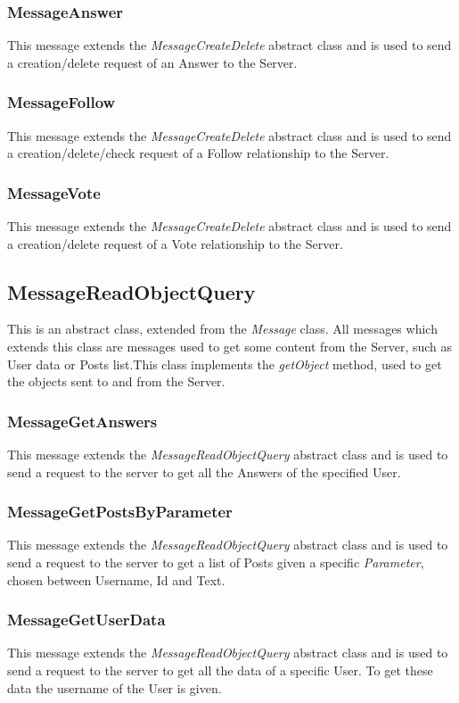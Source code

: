 \documentclass[11pt]{report}
\begin{document}
\subsubsection{MessageAnswer}
This message extends the \textit{MessageCreateDelete} abstract class and is used to send a creation/delete request of an Answer to the Server.
\subsubsection{MessageFollow}
This message extends the \textit{MessageCreateDelete} abstract class and is used to send a creation/delete/check request of a Follow relationship to the Server.
\subsubsection{MessageVote}
This message extends the \textit{MessageCreateDelete} abstract class and is used to send a creation/delete request of a Vote relationship to the Server. 
\newpage
\subsection{MessageReadObjectQuery}
This is an abstract class, extended from the \textit{Message} class. All messages which extends this class are messages used to get some content from the Server, such as User data or Posts list.This class implements the \textit{getObject} method, used to get the objects sent to and from the Server.
\subsubsection{MessageGetAnswers}
This message extends the \textit{MessageReadObjectQuery} abstract class and is used to send a request to the server to get all the Answers of the specified User.
\subsubsection{MessageGetPostsByParameter}
This message extends the \textit{MessageReadObjectQuery} abstract class and is used to send a request to the server to get a list of Posts given a specific \textit{Parameter}, chosen between Username, Id and Text.
\subsubsection{MessageGetUserData}
This message extends the \textit{MessageReadObjectQuery} abstract class and is used to send a request to the server to get all the data of a specific User. To get these data the username of the User is given.
\end{document}
